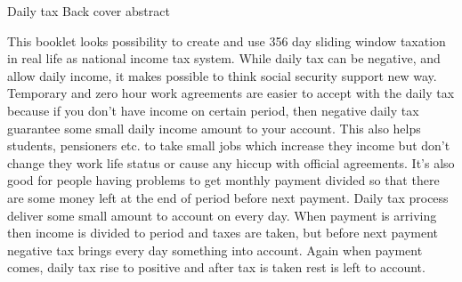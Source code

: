 %
%
%
Daily tax\hspace*{\fill}
\linebreak
Back cover abstract\hfill
\label{abstract}
\linebreak

This booklet looks possibility to create and use 356 day sliding window taxation
in real life as national income tax system.
While daily tax can be negative, and allow daily income,
it makes possible to think social security support new way.
Temporary and zero hour work agreements are easier to accept with the daily tax
because if you don't have income on certain period,
then negative daily tax guarantee some small daily income amount to your account.
This also helps students, pensioners etc. to take small jobs which increase they income
but don't change they work life status or cause any hiccup with official agreements.
It's also good for people having problems to get monthly payment divided so
that there are some money left at the end of period before next payment.
Daily tax process deliver some small amount to account on every day.
When payment is arriving then income is divided to period and taxes are taken,
but before next payment negative tax brings every day something into account.
Again when payment comes,
daily tax rise to positive and after tax is taken rest is left to account.
